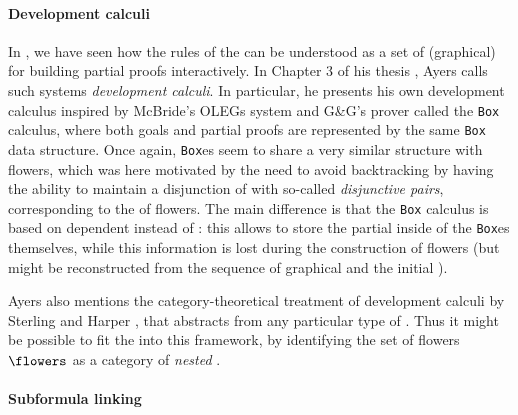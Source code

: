 \begin{scope}
\paragraph{Development calculi}

In , we have seen how the rules of the  can be understood as a set of (graphical)  for building
partial proofs interactively. In Chapter 3 of his thesis
, Ayers calls such systems \emph{development calculi}. In
particular, he presents his own development calculus inspired by McBride's OLEGs
system  and G\&G's prover
 called the \texttt{Box} calculus, where both
goals and partial proofs are represented by the same \texttt{Box} data
structure. Once again, \texttt{Box}es seem to share a very similar structure
with flowers, which was here motivated by the need to avoid backtracking by
having the ability to maintain a disjunction of  with so-called
\emph{disjunctive pairs}, corresponding to the  of flowers. The main
difference is that the \texttt{Box} calculus is based on dependent  instead of : this allows to store the partial
 inside of the \texttt{Box}es themselves, while this information
is lost during the construction of flowers (but might be reconstructed from the
sequence of graphical  and the initial ).

Ayers also mentions the category-theoretical treatment of development calculi by
Sterling and Harper , that abstracts from any
particular type of . Thus it might be possible to fit the  into this framework, by identifying the set of flowers $\flowers$ as a
category of \emph{nested }.

\paragraph{Subformula linking}


\end{scope}
